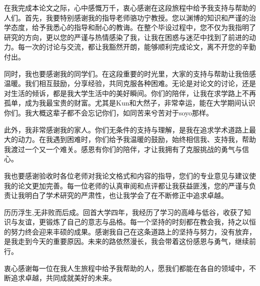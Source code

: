 \begin{acknowledgements}

在我完成本论文之际，心中感慨万千，衷心感谢在这段旅程中给予我支持与帮助的人们。首先，我要特别感谢我的指导老师骆功宁教授。您以渊博的知识和严谨的治学态度，给予我悉心的指导和耐心的教诲。在整个毕设过程中，您不仅为我指明了研究的方向，更以您的严谨与热情感染了我，让我在困惑与迷茫中找到了前进的动力。每一次的讨论与交流，都让我豁然开朗，能够顺利完成论文，离不开您的辛勤付出。

同时，我也要感谢我的同学们。在这段重要的时光里，大家的支持与帮助让我倍感温暖。我们相互鼓励，分享经验，共同克服各种困难。无论是对论文的讨论，还是对生活的倾诉，都是我大学生活中的美好瞬间。你们的陪伴，让我在求学路上不再孤单，成为我最宝贵的财富。尤其是Kun和大然子，非常幸运，能在大学期间认识你们。我大概这辈子都不会忘记你们，如同苦来兮苦对于soyo那样。

此外，我非常感谢我的家人。你们无条件的支持与理解，是我在追求学术道路上最大的动力。在我遇到困难时，你们给予我温暖的鼓励，始终相信我、支持我，帮助我渡过一个又一个难关。感恩有你们的陪伴，才让我拥有了克服挑战的勇气与信心。

我也要感谢验收时各位老师对我论文格式和内容的指导，您们的专业意见与建议使我的论文更加完善。每一位老师的认真审阅和点评都让我获益匪浅，您的严谨与负责让我明白了学术研究的严肃性，也让我学会了在不断修正中追求卓越。

历历浮生,无非败而后成。回首大学四年，我经历了学习的高峰与低谷，收获了知识与友谊，更锻炼了自己的意志与品格。每一个坚持的时刻都在教会我，持之以恒的努力终会迎来丰硕的成果。感谢我自己在这条道路上的坚持与努力，没有放弃，是我走到今天的重要原因。未来的路依然漫长，我会带着这份感恩与勇气，继续前行。

衷心感谢每一位在我人生旅程中给予我帮助的人，愿我们都能在各自的领域中，不断追求卓越，共同成就美好的未来。


\end{acknowledgements}
